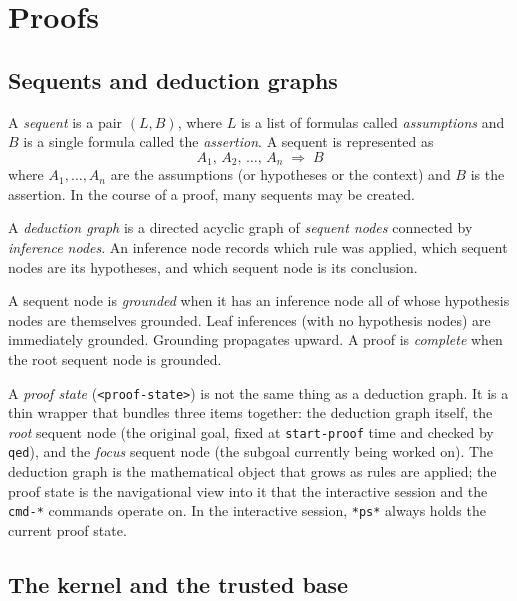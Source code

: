 \chapter{Proofs}
\label{ch:proofs}

\section{Sequents and deduction graphs}\label{section:sequents}

A \emph{sequent} is a pair $(L, B)$, where $L$ is a list of formulas
called \emph{assumptions} and $B$ is a single formula called the
\emph{assertion}.  A sequent is represented as
\[
  A_1,\, A_2,\, \ldots,\, A_n \;\Longrightarrow\; B
\]
where $A_1, \ldots, A_n$ are the assumptions (or hypotheses or the context) and $B$
is the assertion. In the course of a proof, many sequents may be created.

A \emph{deduction graph} is a directed acyclic graph of
\emph{sequent nodes} connected by \emph{inference nodes}.  An inference
node records which rule was applied, which sequent nodes are its
hypotheses, and which sequent node is its conclusion.

A sequent node is \emph{grounded} when it has an inference node all of
whose hypothesis nodes are themselves grounded.  Leaf inferences (with no
hypothesis nodes) are immediately grounded.  Grounding propagates upward.
A proof is \emph{complete} when the root sequent node is grounded.

\begin{remark}
A \emph{proof state} (\texttt{<proof-state>}) is not the same thing as a
deduction graph.  It is a thin wrapper that bundles three items together: the
deduction graph itself, the \emph{root} sequent node (the original goal,
fixed at \texttt{start-proof} time and checked by \texttt{qed}), and the
\emph{focus} sequent node (the subgoal currently being worked on).  The
deduction graph is the mathematical object that grows as rules are applied;
the proof state is the navigational view into it that the interactive session
and the \texttt{cmd-*} commands operate on.  In the interactive session,
\texttt{*ps*} always holds the current proof state.
\end{remark}

\section{The kernel and the trusted base}\label{sec:kernel-boundary}

